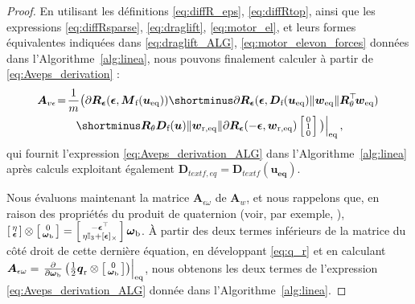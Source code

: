 \begin{proof}
En utilisant les définitions \eqref{eq:diffR_eps}, \eqref{eq:diffRtop}, ainsi que les expressions \eqref{eq:diffRsparse}, \eqref{eq:draglift}, \eqref{eq:motor_el}, et leurs formes équivalentes indiquées dans \eqref{eq:draglift_ALG}, \eqref{eq:motor_elevon_forces} données dans l'Algorithme~\ref{alg:linea}, nous pouvons finalement calculer à partir de \eqref{eq:Aveps_derivation} : 
\begin{multline*}
    \!\boldsymbol{A}_{v\epsilon} \!=\! \frac{1}{m} \big( \partial \boldsymbol{R}_{\boldsymbol{ \epsilon}} (\boldsymbol{ \epsilon} , \boldsymbol{M}_{\text{f}}(\boldsymbol{u_{\text{eq}}}))  \shortminus \partial \boldsymbol{R}_{\boldsymbol{ \epsilon}} ( \boldsymbol{ \epsilon} ,\boldsymbol{D}_{\text{f}}(\boldsymbol{u_{\text{eq}}})  \lVert \boldsymbol{w}_{\mathrm{eq}} \rVert  \boldsymbol{R}_\theta^\top \! \boldsymbol{w}_{\mathrm{eq}})  \\    \left. \shortminus  \boldsymbol{R}_\theta \boldsymbol{D}_{\text{f}}(\boldsymbol{u})  \lVert \boldsymbol{w}_{\mathrm{r,eq}} \rVert \partial \boldsymbol{R}_{\boldsymbol{ \epsilon}}( -\boldsymbol{ \epsilon}, \boldsymbol{w}_{\mathrm{r,eq}})\smallmat{0\\ 1\\ 0} \big)\right|_{\mathrm{eq}},
\end{multline*}
qui fournit l'expression \eqref{eq:Aveps_derivation_ALG} dans l'Algorithme~\ref{alg:linea} après calculs exploitant également $\boldsymbol{D}_{text{f,eq}} = \boldsymbol{D}_{text{f}}(\boldsymbol{u_{\text{eq}}})$.

Nous évaluons maintenant la matrice $\boldsymbol{A}_{\epsilon \omega}$ de  $\boldsymbol{A}_{w}$, et nous rappelons que, en raison des propriétés du produit de quaternion (voir, par exemple, \cite{hamel_minhduc}), 
$\left[ \begin{smallmatrix}\eta \\ \boldsymbol{\epsilon} \end{smallmatrix} \right] \otimes \left[ \begin{smallmatrix}0 \\ 
\boldsymbol{\omega}_{\mathrm{b}} \end{smallmatrix} \right] = 
\left[ \begin{smallmatrix} - \boldsymbol{\epsilon}^\top  \\ 
\eta \mathbb{I}_{3}   + [ \boldsymbol{\epsilon}]_{\times} 
 \end{smallmatrix} \right] \boldsymbol{\omega}_{\mathrm{b}}$. 
À partir des deux termes inférieurs de la matrice du côté droit de cette dernière équation, en développant \eqref{eq:q_r}
et en calculant $\boldsymbol{A}_{\epsilon \omega} = \left. \frac{\partial }{\partial \boldsymbol{\omega}_{\text{b}}} \left( \frac{1}{2} \boldsymbol{{q}}_{\text{r}}  \otimes \left[ \begin{smallmatrix}0 \\ \boldsymbol{\omega}_{\text{b}} \end{smallmatrix} \right] \right) \right|_{\mathrm{eq}}$,
nous obtenons les deux termes de l'expression \eqref{eq:Aveps_derivation_ALG} donnée dans l'Algorithme~\ref{alg:linea}.


\end{proof}
